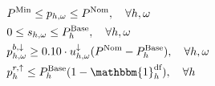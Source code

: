 {\begin{subequations}
\begin{align}
        \quad                                                                                             & \quad P^{\text{Min}} \leq p_{h,\omega} \leq P^{\text{Nom}}, \quad                                                                                                                                           \forall{h,\omega}                                                                             \label{power:11}                                                        \\
        \quad                                                                                             & \quad 0 \leq s_{h,\omega} \leq P^{\text{Base}}_{h}, \quad                                                                                                                                                   \forall{h,\omega}                                                                             \label{power:12}                                                        \\
        \quad                                                                                             & \quad p^{b, \downarrow}_{h,\omega} \geq 0.10 \cdot u^{\downarrow}_{h,\omega} (P^{\text{Nom}} - P^{\text{Base}}_{h}), \quad                                                                                  \forall{h,\omega}                                                                             \label{power:14}                                                        \\
        \quad                                                                                             & \quad p^{r, \uparrow}_{h} \leq P^{\text{Base}}_{h} (1 - \mathbbm{1}_{h}^{\text{df}}), \quad                                                                                                                 \forall{h} \label{power:15}                                                                                                                                           \\

\end{align}
\end{subequations}}
